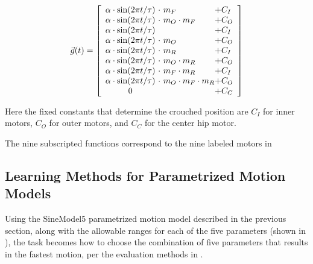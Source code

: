 \[
\vec{g}(t) =
\left[ {\begin{array}{c@{ }l@{ }l}
\amp \cdot \sin(2\pi t / \tau) & \ \cdot \           m_F            & + C_I \\ %
\amp \cdot \sin(2\pi t / \tau) & \ \cdot \ m_O \cdot m_F            & + C_O \\ %
\amp \cdot \sin(2\pi t / \tau) & \                                  & + C_I \\ %
\amp \cdot \sin(2\pi t / \tau) & \ \cdot \ m_O                      & + C_O \\ %
\amp \cdot \sin(2\pi t / \tau) & \ \cdot \                     m_R  & + C_I \\ %
\amp \cdot \sin(2\pi t / \tau) & \ \cdot \ m_O           \cdot m_R  & + C_O \\ %
\amp \cdot \sin(2\pi t / \tau) & \ \cdot \           m_F \cdot m_R  & + C_I \\ %
\amp \cdot \sin(2\pi t / \tau) & \ \cdot \ m_O \cdot m_F \cdot m_R  & + C_O \\ %
0                              & \                                  & + C_C \\ %
\end{array} } \right]
\]

\noindent Here the fixed constants that determine the crouched
position are $C_I$ for inner motors, $C_O$ for outer motors, and $C_C$
for the center hip motor.


The nine subscripted functions correspond to the nine labeled motors
in 




\subsection{Learning Methods for Parametrized Motion Models}

Using the SineModel5 parametrized motion model described in the
previous section, along with the allowable ranges for each of the five
parameters (shown in ), the task becomes how to
choose the combination of five parameters that results in the fastest
motion, per the evaluation methods in .

